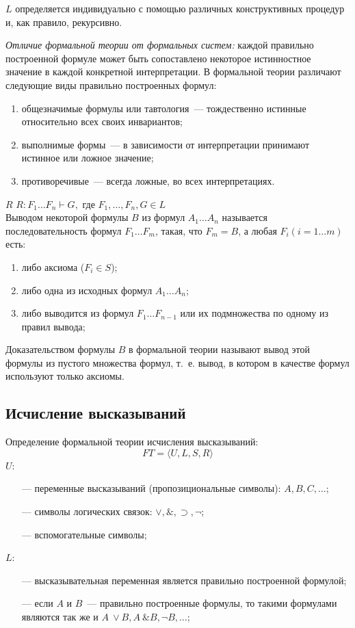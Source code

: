 \documentclass[a4paper,12pt]{report}
\begin{document}
	$ L $ определяется индивидуально с помощью различных конструктивных
	процедур и, как правило, рекурсивно.

	\textit{Отличие формальной теории от формальных систем:} каждой правильно
	построенной формуле может быть сопоставлено некоторое истинностное значение в
	каждой конкретной интерпретации. В формальной теории различают следующие виды
	правильно построенных формул:
	\begin{enumerate}
		\item общезначимые формулы или тавтология~--- тождественно истинные
			относительно всех своих инвариантов;
		\item выполнимые формы~--- в зависимости от интерпретации принимают
			истинное или ложное значение;
		\item противоречивые~--- всегда ложные, во всех интерпретациях.\\
	\end{enumerate}

	$ R $ $ \textit{R}: F_1 \dots F_n \vdash G, $ где $ F_1, \dots, F_n,
	G \in L $\\
	Выводом некоторой формулы $ B $ из формул $ A_1 \dots A_n $ называется
	последовательность формул $ F_1 \dots F_m $, такая, что $ F_m = B $, а любая
	$ F_i (i = 1 \dots m) $ есть:
	\begin{enumerate}
		\item либо аксиома ($ F_i \in S $);
		\item либо одна из исходных формул $ A_1 \dots A_n $;
		\item либо выводится из формул $ F_1 \dots F_{n-1} $ или их подмножества по
			одному из правил вывода;
	\end{enumerate}

	Доказательством формулы $ B $ в формальной теории называют вывод этой формулы
	из пустого множества формул, т.~е. вывод, в котором в качестве формул
	используют только аксиомы.


\subsection{Исчисление высказываний}
	Определение формальной теории исчисления высказываний:
	$$ FT = \langle U, L, S, R \rangle $$
	$ U $:
	\begin{itemize}
		\item[---] переменные высказываний (пропозициональные символы):
			$ A, B, C, \dots $;
		\item[---] символы логических связок: $ \vee, \&, \supset, \neg $;
		\item[---] вспомогательные символы;
	\end{itemize}
	$ L $:
	\begin{itemize}
		\item[---] высказывательная переменная является правильно построенной
			формулой;
		\item[---] если $ A $ и $ B $~--- правильно построенные формулы, то такими
			формулами являются так же и $ A~\vee B, A~\& B, \neg B, \dots $;
	\end{itemize}
\end{document}
